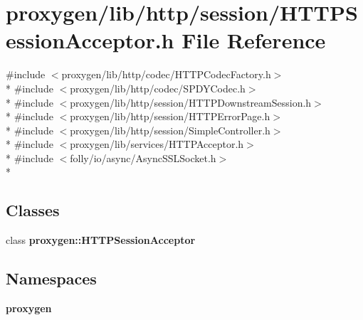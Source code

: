 \section{proxygen/lib/http/session/\+H\+T\+T\+P\+Session\+Acceptor.h File Reference}
\label{HTTPSessionAcceptor_8h}
{\ttfamily \#include $<$proxygen/lib/http/codec/\+H\+T\+T\+P\+Codec\+Factory.\+h$>$}\\*
{\ttfamily \#include $<$proxygen/lib/http/codec/\+S\+P\+D\+Y\+Codec.\+h$>$}\\*
{\ttfamily \#include $<$proxygen/lib/http/session/\+H\+T\+T\+P\+Downstream\+Session.\+h$>$}\\*
{\ttfamily \#include $<$proxygen/lib/http/session/\+H\+T\+T\+P\+Error\+Page.\+h$>$}\\*
{\ttfamily \#include $<$proxygen/lib/http/session/\+Simple\+Controller.\+h$>$}\\*
{\ttfamily \#include $<$proxygen/lib/services/\+H\+T\+T\+P\+Acceptor.\+h$>$}\\*
{\ttfamily \#include $<$folly/io/async/\+Async\+S\+S\+L\+Socket.\+h$>$}\\*
\subsection*{Classes}
\begin{DoxyCompactItemize}
\item 
class {\bf proxygen\+::\+H\+T\+T\+P\+Session\+Acceptor}
\end{DoxyCompactItemize}
\subsection*{Namespaces}
\begin{DoxyCompactItemize}
\item 
 {\bf proxygen}
\end{DoxyCompactItemize}
